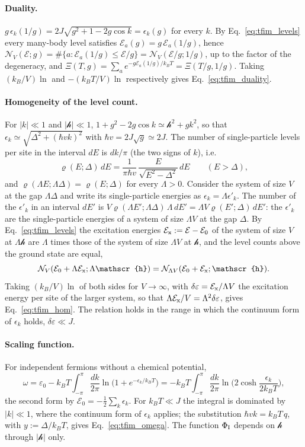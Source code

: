 \documentclass[10pt,a4paper]{article}
\theoremstyle{plain}
\newcommand{\cN}{\mathcal{N}}   %
\newcommand{\hfield}{\mathscr{h}}  %
\newcommand{\enrg}{\mathcal{E}}  %
\newcommand{\cE}{\mathcal{E}_{\rm x}}  %
\begin{document}
\paragraph{Duality.} $g\,\epsilon_k(1/g)=2J\sqrt{g^{2}+1-2g\cos k}=\epsilon_k(g)$
for every $k$. By Eq.~\eqref{eq:tfim_levels} every many-body level
satisfies $\enrg_a(g)=g\,\enrg_a(1/g)$, hence
$\cN_V(\enrg;g)=\#\{a:\enrg_a(1/g)\le\enrg/g\}=\cN_V(\enrg/g;1/g)$, up to the
factor of the degeneracy, and
$\Xi(T,g)=\sum_ae^{-g\enrg_a(1/g)/k_BT}=\Xi(T/g,1/g)$. Taking
$(k_B/V)\ln$ and $-(k_BT/V)\ln$ respectively gives
Eq.~\eqref{eq:tfim_duality}.

\paragraph{Homogeneity of the level count.} For $|k|\ll1$ and $|\hfield|\ll1$,
$1+g^{2}-2g\cos k\simeq\hfield^{2}+gk^{2}$, so that
$\epsilon_k\simeq\sqrt{\Delta^{2}+(\hbar vk)^{2}}$ with $\hbar v=2J\sqrt g\simeq2J$.
The number of single-particle levels per site in the interval $dE$ is
$dk/\pi$ (the two signs of $k$), i.e.
\[
  \varrho(E;\Delta)\,dE=\frac{1}{\pi\hbar v}\,\frac{E}{\sqrt{E^{2}-\Delta^{2}}}\,dE
  \qquad(E>\Delta) ,
\]
and $\varrho(\Lambda E;\Lambda\Delta)=\varrho(E;\Delta)$ for every
$\Lambda>0$. Consider the system of size $V$ at the gap $\Lambda\Delta$ and
write its single-particle energies as $\epsilon_k=\Lambda\epsilon'_k$. The
number of the $\epsilon'_k$ in an interval $dE'$ is
$V\varrho(\Lambda E';\Lambda\Delta)\,\Lambda\,dE'=\Lambda V\varrho(E';\Delta)\,dE'$:
the $\epsilon'_k$ are the single-particle energies of a system of size
$\Lambda V$ at the gap $\Delta$. By Eq.~\eqref{eq:tfim_levels} the
excitation energies $\cE:=\enrg-\enrg_0$ of the system of size $V$ at
$\Lambda\hfield$ are $\Lambda$ times those of the system of size $\Lambda V$
at $\hfield$, and the level counts above the ground state are equal,
\[
  \cN_V(\enrg_0+\Lambda\cE;\Lambda\hfield)=\cN_{\Lambda V}(\enrg_0+\cE;\hfield) .
\]
Taking $(k_B/V)\ln$ of both sides for $V\to\infty$, with
$\delta\varepsilon=\cE/\Lambda V$ the excitation energy per site of the
larger system, so that $\Lambda\cE/V=\Lambda^{2}\delta\varepsilon$, gives
Eq.~\eqref{eq:tfim_hom}. The relation holds in the range in which the
continuum form of $\epsilon_k$ holds, $\delta\varepsilon\ll J$.

\paragraph{Scaling function.} For independent fermions without a chemical
potential,
\[
  \omega=\varepsilon_0-k_BT\int_{-\pi}^{\pi}\frac{dk}{2\pi}\ln\big(1+e^{-\epsilon_k/k_BT}\big)
  =-k_BT\int_{-\pi}^{\pi}\frac{dk}{2\pi}\ln\Big(2\cosh\frac{\epsilon_k}{2k_BT}\Big) ,
\]
the second form by $\enrg_0=-\tfrac12\sum_k\epsilon_k$. For $k_BT\ll J$ the
integral is dominated by $|k|\ll1$, where the continuum form of
$\epsilon_k$ applies; the substitution $\hbar vk=k_BT\,q$, with
$y:=\Delta/k_BT$, gives Eq.~\eqref{eq:tfim_omega}. The function
$\Phi_{\rm I}$ depends on $\hfield$ through $|\hfield|$ only.
\end{document}
